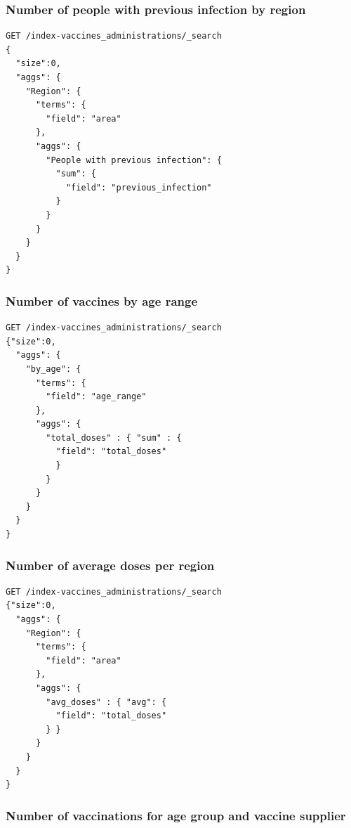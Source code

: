 \documentclass[12pt, a4paper]{article}
\begin{document}
\subsubsection{Number of people with previous infection by region}

\begin{tcolorbox}[fontupper=\scriptsize]
    \begin{verbatim}
GET /index-vaccines_administrations/_search
{
  "size":0,
  "aggs": {
    "Region": {
      "terms": {
        "field": "area"
      },
      "aggs": {
        "People with previous infection": {
          "sum": {
            "field": "previous_infection"
          }
        }
      }
    }
  }
}
    \end{verbatim}
\end{tcolorbox}

\subsubsection{Number of vaccines by age range}

\begin{tcolorbox}[fontupper=\scriptsize]
    \begin{verbatim}
GET /index-vaccines_administrations/_search
{"size":0,
  "aggs": {
    "by_age": {
      "terms": {
        "field": "age_range"
      },
      "aggs": {
        "total_doses" : { "sum" : { 
          "field": "total_doses"
          }
        }
      }
    }
  }
}

    \end{verbatim}
\end{tcolorbox}

\subsubsection{Number of average doses per region}

\begin{tcolorbox}[fontupper=\scriptsize]
    \begin{verbatim}
GET /index-vaccines_administrations/_search
{"size":0,
  "aggs": {
    "Region": {
      "terms": {
        "field": "area"
      },
      "aggs": {
        "avg_doses" : { "avg": {
          "field": "total_doses"
        } } 
      }
    }
  }
}

    \end{verbatim}
\end{tcolorbox}

\subsubsection{Number of vaccinations for age group and vaccine supplier}
\end{document}
